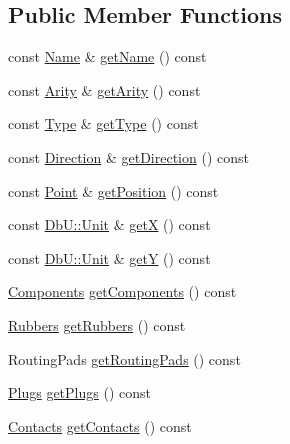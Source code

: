 \subsection*{Public Member Functions}
\begin{DoxyCompactItemize}
\item 
const \hyperlink{classHurricane_1_1Name}{Name} \& \hyperlink{classHurricane_1_1Net_aeba73ca641db371dde29baf348b58bba}{get\+Name} () const
\item 
const \hyperlink{classHurricane_1_1Net_a3a242d929e0c733f90f3f69be8cc427b}{Arity} \& \hyperlink{classHurricane_1_1Net_a78de2202fcf4f16024b4460ebb7dc907}{get\+Arity} () const
\item 
const \hyperlink{classHurricane_1_1Net_1_1Type}{Type} \& \hyperlink{classHurricane_1_1Net_a0fa61dc0ccb67f384f03b35f83d391e7}{get\+Type} () const
\item 
const \hyperlink{classHurricane_1_1Net_1_1Direction}{Direction} \& \hyperlink{classHurricane_1_1Net_aa84245d734dfaa572660a1a2c1bfc56e}{get\+Direction} () const
\item 
const \hyperlink{classHurricane_1_1Point}{Point} \& \hyperlink{classHurricane_1_1Net_abcfdec9c953d228845fdb9d75e8173cc}{get\+Position} () const
\item 
const \hyperlink{group__DbUGroup_ga4fbfa3e8c89347af76c9628ea06c4146}{Db\+U\+::\+Unit} \& \hyperlink{classHurricane_1_1Net_a1f8f4c4632614b84a1227a1da8310428}{getX} () const
\item 
const \hyperlink{group__DbUGroup_ga4fbfa3e8c89347af76c9628ea06c4146}{Db\+U\+::\+Unit} \& \hyperlink{classHurricane_1_1Net_aa97899b408aa47ec22792b5c6d6e9216}{getY} () const
\item 
\hyperlink{namespaceHurricane_a7d26d99aeb5dd6d70d51bd35d2473e72}{Components} \hyperlink{classHurricane_1_1Net_a1e2d7ef9bab15694870a605e514f26e8}{get\+Components} () const
\item 
\hyperlink{namespaceHurricane_af8923abd57508cc44931a00d61b564ad}{Rubbers} \hyperlink{classHurricane_1_1Net_a6ddbe2697a7fd7a7cd359f97b2ad0223}{get\+Rubbers} () const
\item 
Routing\+Pads \hyperlink{classHurricane_1_1Net_a1078d55acf3efa0b3c23cd345cae87fa}{get\+Routing\+Pads} () const
\item 
\hyperlink{namespaceHurricane_ac8335d2057483ee7a935c15a9460c64f}{Plugs} \hyperlink{classHurricane_1_1Net_a88322672c105405a61a78022359178aa}{get\+Plugs} () const
\item 
\hyperlink{namespaceHurricane_a1e6a8ab09f688509bd727b3fee02d0d2}{Contacts} \hyperlink{classHurricane_1_1Net_a9c397596fe9ecbf674712c72e0b9010c}{get\+Contacts} () const

\end{DoxyCompactItemize}
